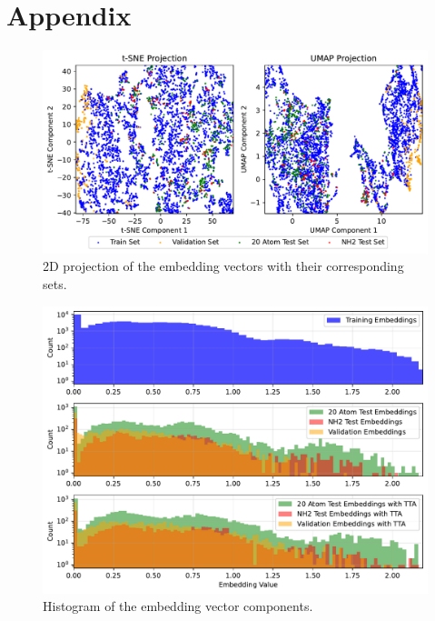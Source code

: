 \documentclass[11pt,a4paper]{article}
\begin{document}



\section{Appendix}

\begin{figure}[htbp]
        \centering
        \includegraphics[width=1\textwidth]{sets.pdf}
        \caption{2D projection of the embedding vectors with their corresponding sets.}
        \label{fig:sets}
\end{figure}

\begin{figure}[htbp]
        \centering
        \includegraphics[width=1\textwidth]{embedding_histogram.pdf}
        \caption{Histogram of the embedding vector components.}
        \label{fig:embedding_histogram}
\end{figure}
\end{document}
